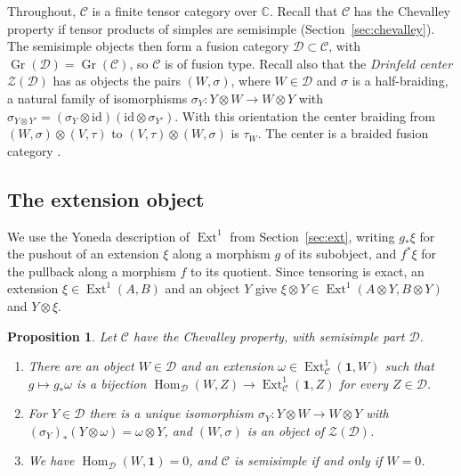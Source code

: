 \documentclass[11pt,reqno]{amsart}
\newtheorem{proposition}[theorem]{Proposition}
\theoremstyle{definition}
\newcommand{\Hom}{\operatorname{Hom}}
\newcommand{\Ext}{\operatorname{Ext}}
\newcommand{\one}{\mathbf 1}
\newcommand{\C}{\mathcal C}
\newcommand{\CC}{\mathbb C}
\DeclareMathOperator{\Gr}{Gr}
\begin{document}
Throughout, $\C$ is a finite tensor category over $\CC$. Recall that $\C$ has the Chevalley property if tensor products of simples are semisimple (Section~\ref{sec:chevalley}). The semisimple objects then form a fusion category $\mathcal D\subset\C$, with $\Gr(\mathcal D)=\Gr(\C)$, so $\C$ is of fusion type. Recall also that the \emph{Drinfeld center} $\mathcal Z(\mathcal D)$ has as objects the pairs $(W,\sigma)$, where $W\in\mathcal D$ and $\sigma$ is a half-braiding, a natural family of isomorphisms $\sigma_Y:Y\otimes W\to W\otimes Y$ with $\sigma_{Y\otimes Y'}=(\sigma_Y\otimes\mathrm{id})(\mathrm{id}\otimes\sigma_{Y'})$. With this orientation the center braiding from $(W,\sigma)\otimes(V,\tau)$ to $(V,\tau)\otimes(W,\sigma)$ is $\tau_W$. The center is a braided fusion category \cite[\S\S7.13 and~8.5]{EGNO}.

\subsection{The extension object}
We use the Yoneda description of $\Ext^1$ from Section~\ref{sec:ext}, writing $g_*\xi$ for the pushout of an extension $\xi$ along a morphism $g$ of its subobject, and $f^*\xi$ for the pullback along a morphism $f$ to its quotient. Since tensoring is exact, an extension $\xi\in\Ext^1(A,B)$ and an object $Y$ give $\xi\otimes Y\in\Ext^1(A\otimes Y,B\otimes Y)$ and $Y\otimes\xi$.

\begin{proposition}\label{prop:ext-object}
Let $\C$ have the Chevalley property, with semisimple part $\mathcal D$.
\begin{enumerate}
\item There are an object $W\in\mathcal D$ and an extension $\omega\in\Ext^1_\C(\one,W)$ such that $g\mapsto g_*\omega$ is a bijection $\Hom_{\mathcal D}(W,Z)\to\Ext^1_\C(\one,Z)$ for every $Z\in\mathcal D$.
\item For $Y\in\mathcal D$ there is a unique isomorphism $\sigma_Y:Y\otimes W\to W\otimes Y$ with $(\sigma_Y)_*(Y\otimes\omega)=\omega\otimes Y$, and $(W,\sigma)$ is an object of $\mathcal Z(\mathcal D)$.
\item We have $\Hom_{\mathcal D}(W,\one)=0$, and $\C$ is semisimple if and only if $W=0$.
\end{enumerate}
\end{proposition}
\end{document}
